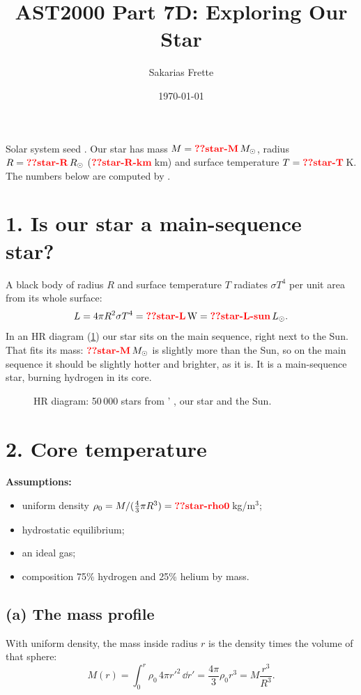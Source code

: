 \documentclass[11pt,a4paper]{article}
\title{AST2000 Part 7D: Exploring Our Star}
\author{Sakarias Frette}
\date{\today}
\begin{document}
\maketitle

Solar system seed .
Our star has mass $M=\val{star-M}\,\Msun$, radius $R=\val{star-R}\,R_\odot$ ($\val{star-R-km}$\,km) and surface temperature $T=\val{star-T}$\,K.
The numbers below are computed by .

\section*{1. Is our star a main-sequence star?}
A black body of radius $R$ and surface temperature $T$ radiates $\sigma T^4$ per unit area from its whole surface:
\begin{equation}
  L=4\pi R^2\sigma T^4=\val{star-L}\,\mathrm{W}=\val{star-L-sun}\,L_\odot .
\end{equation}
In an HR diagram (\cref{fig:hr}) our star sits on the main sequence, right next to the Sun.
That fits its mass: $\val{star-M}\,\Msun$ is slightly more than the Sun, so on the main sequence it should be slightly hotter and brighter, as it is.
It is a main-sequence star, burning hydrogen in its core.

\begin{figure}[h]\centering{}
\caption{HR diagram: 50\,000 stars from ' , our star and the Sun.}\label{fig:hr}\end{figure}

\section*{2. Core temperature}
\textbf{Assumptions:}
\begin{itemize}
\item uniform density $\rho_0=M/(\tfrac43\pi R^3)=\val{star-rho0}$\,kg/m$^3$;
\item hydrostatic equilibrium;
\item an ideal gas;
\item composition 75\% hydrogen and 25\% helium by mass.
\end{itemize}

\subsection*{(a) The mass profile}
With uniform density, the mass inside radius $r$ is the density times the volume of that sphere:
\begin{equation}
  M(r)=\int_0^r\rho_0\,4\pi r'^2\,\dd r'=\frac{4\pi}{3}\rho_0r^3=M\frac{r^3}{R^3}.
\end{equation}
\end{document}
